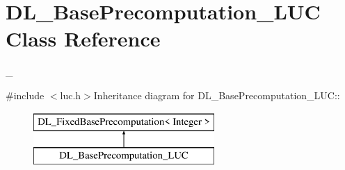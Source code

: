 \hypertarget{class_d_l___base_precomputation___l_u_c}{
\section{DL\_\-BasePrecomputation\_\-LUC Class Reference}
\label{class_d_l___base_precomputation___l_u_c}
}


\_\-  


{\ttfamily \#include $<$luc.h$>$}Inheritance diagram for DL\_\-BasePrecomputation\_\-LUC::\begin{figure}[H]
\begin{center}
\leavevmode
\includegraphics[height=2cm]{class_d_l___base_precomputation___l_u_c}
\end{center}
\end{figure}
